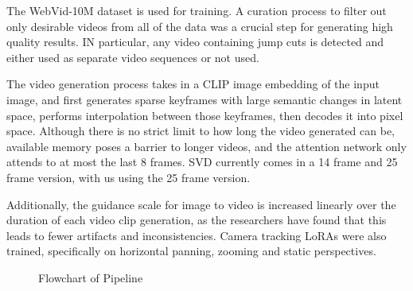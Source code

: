 \documentclass[conference]{IEEEtran}
\begin{document}
 The WebVid-10M dataset is used for training. A curation process to filter out only desirable videos from all of the data was a crucial step for generating high quality results. IN particular, any video containing jump cuts is detected and either used as separate video sequences or not used. 
 
 The video generation process takes in a CLIP image embedding of the input image, and first generates sparse keyframes with large semantic changes in latent space, performs interpolation between those keyframes, then decodes it into pixel space. Although there is no strict limit to how long the video generated can be, available memory poses a barrier to longer videos, and the attention network only attends to at most the last 8 frames. SVD currently comes in a 14 frame and 25 frame version, with us using the 25 frame version. 
 
 Additionally, the guidance scale for image to video is increased linearly over the duration of each video clip generation, as the researchers have found that this leads to fewer artifacts and inconsistencies. Camera tracking LoRAs were also trained, specifically on horizontal panning, zooming and static perspectives.

\begin{figure}[ht]
    \centering
    \caption{Flowchart of Pipeline}
    \label{fig:pipeline}
\end{figure}
\end{document}
